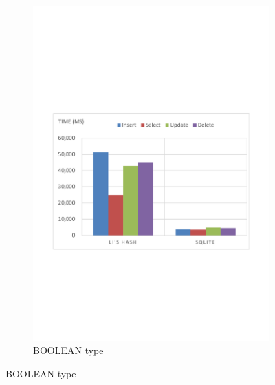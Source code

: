 \begin{figure}
\begin{subfigure}[b]{0.4\textwidth}
                \includegraphics[width=\textwidth]{./performance/result/index-layer/image/100only/boolean1.pdf}
                \caption{BOOLEAN type}
                \label{fig:performance:result:index-layer:insert:int}
        \end{subfigure}


\end{figure}
